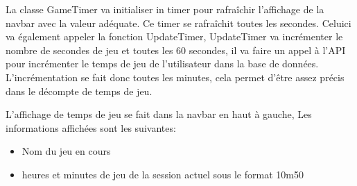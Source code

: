 \documentclass[a4paper,12pt,french]{sphinxmanual}
\begin{document}
\sphinxAtStartPar
La classe GameTimer va initialiser in timer pour rafraîchir l’affichage de la navbar avec la valeur adéquate. Ce timer se rafraîchit toutes les secondes. Celui\sphinxhyphen{}ci va également appeler la fonction UpdateTimer, UpdateTimer va incrémenter le nombre de secondes de jeu et toutes les 60 secondes, il va faire un appel à l’API pour incrémenter le temps de jeu de l’utilisateur dans la base de données. L’incrémentation se fait donc toutes les minutes, cela permet d’être assez précis dans le décompte de temps de jeu.

\begin{sphinxVerbatim}[commandchars=\\\{\}]
  
               
               

              

     

               
                  

                 

\end{sphinxVerbatim}

\sphinxAtStartPar
L’affichage de temps de jeu se fait dans la navbar en haut à gauche, Les informations affichées sont les suivantes:
\begin{itemize}
\item {} 
\sphinxAtStartPar
Nom du jeu en cours

\item {} 
\sphinxAtStartPar
heures et minutes de jeu de la session actuel sous le format 10m50

\end{itemize}
\end{document}
